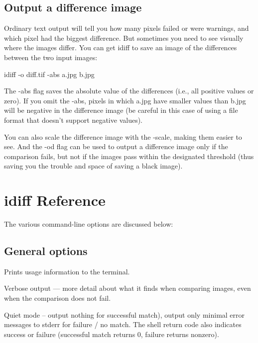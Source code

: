 

\subsection*{Output a difference image}

Ordinary text output will tell you how many pixels failed or were
warnings, and which pixel had the biggest difference.  But sometimes
you need to see visually where the images differ.  You can get
{\cf idiff} to save an image of the differences between the two input
images:

\begin{code}
    idiff -o diff.tif -abs a.jpg b.jpg
\end{code}

The {\cf -abs} flag saves the absolute value of the differences
(i.e., all positive values or zero).  If you omit the {\cf -abs},
pixels in which {\cf a.jpg} have smaller values than {\cf b.jpg}
will be negative in the difference image (be careful in this case
of using a file format that doesn't support negative values).

You can also scale the difference image with the {\cf -scale},
making them easier to see.  And the {\cf -od} flag can be used
to output a difference image only if the comparison fails, but 
not if the images pass within the designated threshold (thus
saving you the trouble and space of saving a black image).


\section{{\cf idiff} Reference}

The various command-line options are discussed below:

\subsection*{General options}

Prints usage information to the terminal.
\apiend

Verbose output --- more detail about what it finds when comparing
images, even when the comparison does not fail.
\apiend

Quiet mode -- output nothing for successful match), output only minimal
error messages to stderr for failure / no match.  The shell return code
also indicates success or failure (successful match returns 0, failure
returns nonzero).
\apiend

